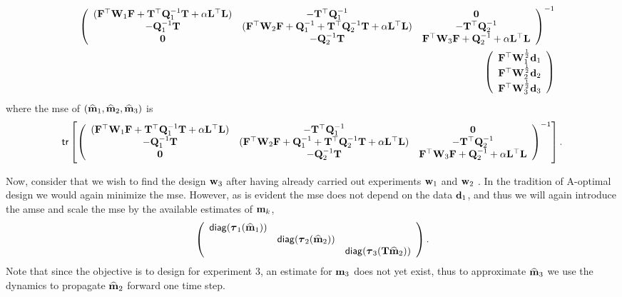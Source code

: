 \documentclass[11pt]{article}
\newcommand{\bfF}	{{\bf{F}}}
\newcommand{\bfL}	{{\bf{L}}}
\newcommand{\bfQ}	{{\bf{Q}}}
\newcommand{\bfT}	{{\bf{T}}}
\newcommand{\bfW}	{{\bf{W}}}
\newcommand{\bfd}	{{\bf{d}}}
\newcommand{\bfm}	{{\bf{m}}}
\newcommand{\bfw}	{{\bf{w}}}
\newcommand{\hf}        {{\frac 12}}
\newcommand{\bftau}      {{\boldsymbol \tau}}
\newcommand{\bfmhat}    {{\widehat{\bfm}}}
\newcommand{\LtL}       { \bfL^{\top}\bfL}
\newcommand {\zero}  { {\bf 0} }
\renewcommand{\hf}		 {\frac12}
\renewcommand{\bfmhat}	{\widehat{\bf m}}
\begin{document}
{\begin{eqnarray}
&&\left(\begin{array}{ccc}(\bfF^{\top}\bfW_1\bfF + \bfT^{\top}\bfQ^{-1}_1\bfT + \alpha\LtL) & -\bfT^{\top}\bfQ^{-1}_1 & \zero\\
 -\bfQ^{-1}_1\bfT & (\bfF^{\top}\bfW_2\bfF + \bfQ^{-1}_1 + \bfT^{\top}\bfQ^{-1}_2\bfT + \alpha\LtL) & -\bfT^{\top}\bfQ^{-1}_2\\
 \zero & -\bfQ^{-1}_2\bfT & \bfF^{\top}\bfW_3\bfF + \bfQ^{-1}_2 + \alpha\LtL 
 \end{array}\right)^{-1}\\	
&&\left(\begin{array}{c}\bfF^{\top}\bfW_1^{\hf}\bfd_1  \\  \bfF^{\top}\bfW_2^{\hf}\bfd_2 \\
\bfF^{\top}\bfW_3^{\hf}\bfd_3 
\end{array}\right)	
\end{eqnarray}
where the {\sf mse} of $(\bfmhat_1,\bfmhat_2, \bfmhat_3)$ is
\begin{equation*}
 {\sf tr}\left[\left(\begin{array}{ccc}(\bfF^{\top}\bfW_1\bfF + \bfT^{\top}\bfQ^{-1}_1\bfT + \alpha\LtL) & -\bfT^{\top}\bfQ^{-1}_1 & \zero\\
 -\bfQ^{-1}_1\bfT & (\bfF^{\top}\bfW_2\bfF + \bfQ^{-1}_1 + \bfT^{\top}\bfQ^{-1}_2\bfT + \alpha\LtL) & -\bfT^{\top}\bfQ^{-1}_2\\
 \zero & -\bfQ^{-1}_2\bfT & \bfF^{\top}\bfW_3\bfF + \bfQ^{-1}_2 + \alpha\LtL 
 \end{array}\right)^{-1}	\right]	.
\end{equation*}

 Now, consider that we wish to find the design $\bfw_3$ after having already carried out experiments $\bfw_1$ and  $\bfw_2$ . In the tradition of A-optimal design we would again minimize the {\sf mse}. However, as is evident  the {\sf mse} does not depend on the data $\bfd_1$, and thus we will again introduce the {\sf amse} and scale the {\sf mse} by the available estimates of $\bfm_{k}$, 
\begin{equation*}
 \left( \begin{array}{ccc}{\sf diag}(\bftau_1(\bfmhat_1))& & \\
  & {\sf diag}(\bftau_2(\bfmhat_2))& 
  \\& & {\sf diag}(\bftau_3(\bfT\bfmhat_2))
  \end{array}\right).
\end{equation*}
Note that since the objective is to design for experiment 3, an estimate for $\bfm_3$ does not yet exist, thus to approximate $\bfmhat_3$ we use the dynamics to propagate $\bfmhat_2$ forward one time step.

}
\end{document}
